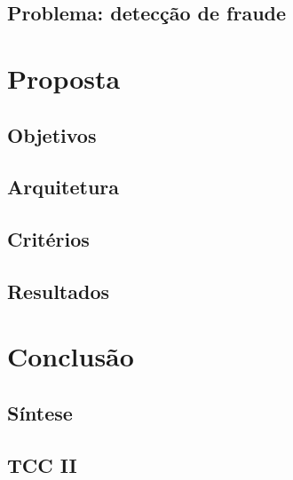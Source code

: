 \documentclass{article}
\begin{document}
\subsection{Problema: detecção de fraude}
\section{Proposta}
\subsection{Objetivos}
\subsection{Arquitetura}
\subsection{Critérios}
\subsection{Resultados}
\section{Conclusão}
\subsection{Síntese}
\subsection{TCC II}
\end{document}
